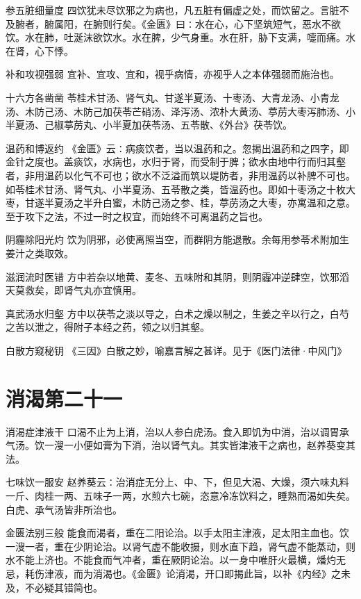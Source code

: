 \documentclass[a4paper,12pt,UTF8,twoside]{ctexbook}
\begin{document}
    参五脏细量度
    四饮犹未尽饮邪之为病也，凡五脏有偏虚之处，而饮留之。言脏不及腑者，腑属阳，在腑则行矣。《金匮》曰∶水在心，心下坚筑短气，恶水不欲饮。水在肺，吐涎沫欲饮水。水在脾，少气身重。水在肝，胁下支满，嚏而痛。水在肾，心下悸。
    
    补和攻视强弱
    宜补、宜攻、宜和，视乎病情，亦视乎人之本体强弱而施治也。
    
    十六方各凿凿
    苓桂术甘汤、肾气丸、甘遂半夏汤、十枣汤、大青龙汤、小青龙汤、木防己汤、木防己加茯苓芒硝汤、泽泻汤、浓朴大黄汤、葶苈大枣泻肺汤、小半夏汤、己椒葶苈丸、小半夏加茯苓汤、五苓散、《外台》茯苓饮。
    
    温药和博返约
    《金匮》云∶病痰饮者，当以温药和之。忽揭出温药和之四字，即金针之度也。盖痰饮，水病也，水归于肾，而受制于脾；欲水由地中行而归其壑者，非用温药以化气不可也；欲水不泛溢而筑以堤防者，非用温药以补脾不可也。如苓桂术甘汤、肾气丸、小半夏汤、五苓散之类，皆温药也。即如十枣汤之十枚大枣，甘遂半夏汤之半升白蜜，木防己汤之参、桂，葶苈汤之大枣，亦寓温和之意。至于攻下之法，不过一时之权宜，而始终不可离温药之旨也。
    
    阴霾除阳光灼
    饮为阴邪，必使离照当空，而群阴方能退散。余每用参苓术附加生姜汁之类取效。
    
    滋润流时医错
    方中若杂以地黄、麦冬、五味附和其阴，则阴霾冲逆肆空，饮邪滔天莫救矣，即肾气丸亦宜慎用。
    
    真武汤水归壑
    方中以茯苓之淡以导之，白术之燥以制之，生姜之辛以行之，白芍之苦以泄之，得附子本经之药，领之以归其壑。
    
    白散方窥秘钥
    《三因》白散之妙，喻嘉言解之甚详。见于《医门法律·中风门》
    
    
    
    \section{消渴第二十一}
        
    消渴症津液干
    口渴不止为上消，治以人参白虎汤。食入即饥为中消，治以调胃承气汤。饮一溲一小便如膏为下消，治以肾气丸。其实皆津液干之病也，赵养葵变其法。
    
    七味饮一服安
    赵养葵云∶治消症无分上、中、下，但见大渴、大燥，须六味丸料一斤、肉桂一两、五味子一两，水煎六七碗，恣意冷冻饮料之，睡熟而渴如失矣。白虎、承气汤皆非所治也。
    
    金匮法别三般
    能食而渴者，重在二阳论治。以手太阳主津液，足太阳主血也。饮一溲一者，重在少阴论治。以肾气虚不能收摄，则水直下趋，肾气虚不能蒸动，则水不能上济也。不能食而气冲者，重在厥阴论治。以一身中唯肝火最横，燔灼无忌，耗伤津液，而为消渴也。《金匮》论消渴，开口即揭此旨，以补《内经》之未及，不必疑其错简也。
    
\end{document}

